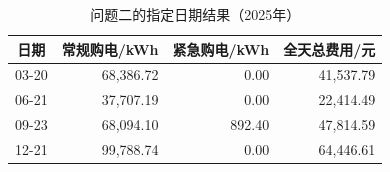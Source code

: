 \par
\begin{table}[!htbp]
\centering
\caption{问题二的指定日期结果（2025年）}\label{tab:q2-days-summary}
\normalsize
\begin{tabular}{lrrr}
\toprule
\multicolumn{1}{c}{日期} & \multicolumn{1}{c}{常规购电/kWh} & \multicolumn{1}{c}{紧急购电/kWh} & \multicolumn{1}{c}{全天总费用/元} \\
\midrule
03-20 & 68,386.72 & 0.00 & 41,537.79 \\
06-21 & 37,707.19 & 0.00 & 22,414.49 \\
09-23 & 68,094.10 & 892.40 & 47,814.59 \\
12-21 & 99,788.74 & 0.00 & 64,446.61 \\
\bottomrule
\end{tabular}
\end{table}
\par

